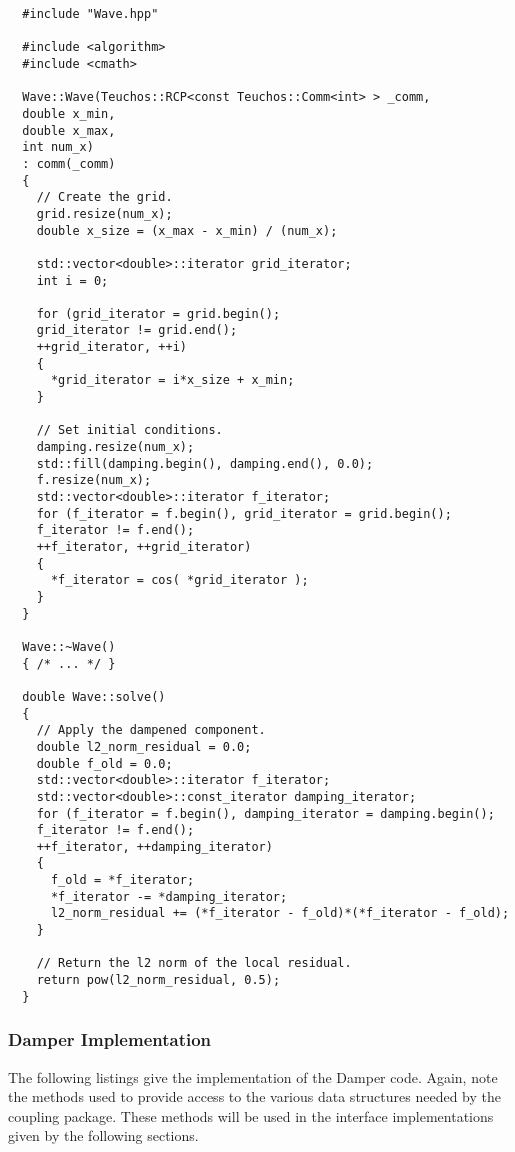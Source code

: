 \documentclass[letterpaper]{article}
\begin{document}
\begin{lstlisting}
  #include "Wave.hpp"

  #include <algorithm>
  #include <cmath>

  Wave::Wave(Teuchos::RCP<const Teuchos::Comm<int> > _comm,
  double x_min,
  double x_max,
  int num_x)
  : comm(_comm)
  {
    // Create the grid.
    grid.resize(num_x);
    double x_size = (x_max - x_min) / (num_x);

    std::vector<double>::iterator grid_iterator;
    int i = 0;

    for (grid_iterator = grid.begin();
    grid_iterator != grid.end();
    ++grid_iterator, ++i)
    {
      *grid_iterator = i*x_size + x_min;
    }

    // Set initial conditions.
    damping.resize(num_x);
    std::fill(damping.begin(), damping.end(), 0.0);
    f.resize(num_x);
    std::vector<double>::iterator f_iterator;
    for (f_iterator = f.begin(), grid_iterator = grid.begin();
    f_iterator != f.end();
    ++f_iterator, ++grid_iterator)
    {
      *f_iterator = cos( *grid_iterator );
    }
  }

  Wave::~Wave()
  { /* ... */ }

  double Wave::solve()
  {
    // Apply the dampened component.
    double l2_norm_residual = 0.0;
    double f_old = 0.0;
    std::vector<double>::iterator f_iterator;
    std::vector<double>::const_iterator damping_iterator;
    for (f_iterator = f.begin(), damping_iterator = damping.begin();
    f_iterator != f.end();
    ++f_iterator, ++damping_iterator)
    {
      f_old = *f_iterator;
      *f_iterator -= *damping_iterator;
      l2_norm_residual += (*f_iterator - f_old)*(*f_iterator - f_old);
    }
    
    // Return the l2 norm of the local residual.
    return pow(l2_norm_residual, 0.5);
  }
\end{lstlisting}

\subsubsection{Damper Implementation}
The following listings give the implementation of the Damper
code. Again, note the methods used to provide access to the various
data structures needed by the coupling package. These methods will be
used in the interface implementations given by the following sections.
\end{document}
